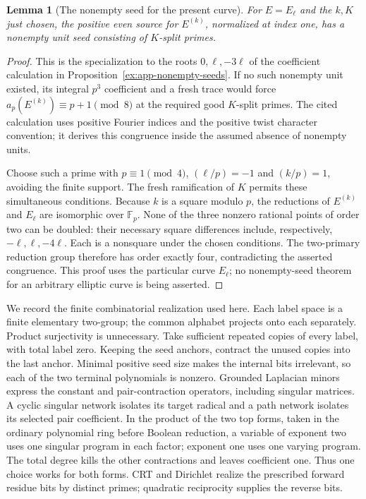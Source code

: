 \documentclass[11pt]{article}
\newtheorem{lemma}[theorem]{Lemma}
\theoremstyle{definition}
\theoremstyle{remark}
\newcommand{\F}{\mathbb F}
\begin{document}
\begin{lemma}[The nonempty seed for the present curve]\label{ex:sec7-ksplit-seed}
For $E=E_\ell$ and the $k,K$ just chosen, the positive even source
for $E^{(k)}$, normalized at index one, has a nonempty unit seed
consisting of $K$-split primes.
\end{lemma}
\begin{proof}\leavevmode
This is the specialization to the roots $0,\ell,-3\ell$ of the
coefficient calculation in Proposition~\ref{ex:app-nonempty-seeds}.
If no such nonempty unit existed, its integral $p^3$ coefficient
and a fresh trace would force
$a_p(E^{(k)})\equiv p+1\pmod8$ at the required good $K$-split primes.
The cited calculation uses positive Fourier indices and the positive
twist character convention; it derives this congruence inside the
assumed absence of nonempty units.

Choose such a prime with $p\equiv1\pmod4$, $(\ell/p)=-1$ and
$(k/p)=1$, avoiding the finite support. The fresh ramification of $K$
permits these simultaneous conditions. Because $k$ is a square modulo
$p$, the reductions of $E^{(k)}$ and $E_\ell$ are isomorphic over
$\F_p$. None of the three nonzero rational points of order two can
be doubled: their necessary square differences include, respectively,
$-\ell,\ell,-4\ell$. Each is a nonsquare under the chosen conditions.
The two-primary reduction group therefore has order exactly four,
contradicting the asserted congruence. This proof uses the particular
curve $E_\ell$; no nonempty-seed theorem for an arbitrary elliptic
curve is being asserted.
\end{proof}

We record the finite combinatorial realization used here. Each label
space is a finite elementary two-group; the common alphabet projects
onto each separately. Product surjectivity is unnecessary. Take
sufficient repeated copies of every label, with total label zero.
Keeping the seed anchors, contract the unused copies into the last
anchor. Minimal positive seed size makes the internal bits irrelevant,
so each of the two terminal polynomials is nonzero. Grounded Laplacian
minors express the constant and pair-contraction operators, including
singular matrices. A cyclic singular network isolates its target
radical and a path network isolates its selected pair coefficient.
In the product of the two top forms, taken in the ordinary polynomial
ring before Boolean reduction, a variable of exponent two uses one
singular program in each factor; exponent one uses one varying program.
The total degree kills the other contractions and leaves coefficient
one. Thus one choice works for both forms. CRT and Dirichlet realize
the prescribed forward residue bits by distinct primes; quadratic
reciprocity supplies the reverse bits.
\end{document}
